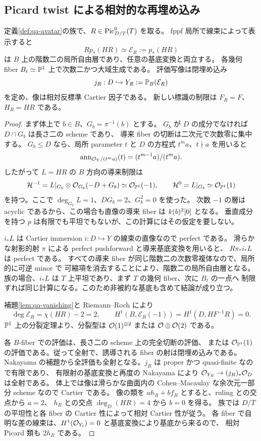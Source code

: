 \subsection{Picard twist による相対的な再埋め込み}

\begin{proposition}[垂直成分がある場合も含む直像]
\label{prop:qa-pushforward}
定義\ref{def:qa-avatar}の族で、$R\in\operatorname{Pic}^0_{D/T}(T)$ を取る。
fppf 局所で線束によって表示すると
\[
 Rp_*(HR)\simeq\mathcal E_R:=p_*(HR)
\]
は $B$ 上の階数二の局所自由層であり、任意の基底変換と両立する。
各幾何 fiber $B_t\simeq\mathbb P^1$ 上で次数二かつ大域生成である。
評価写像は閉埋め込み
\[
 j_R:D\hookrightarrow Y_R:=\mathbb P_B(\mathcal E_R)
\]
を定め、像は相対反標準 Cartier 因子である。
新しい標識の制限は $F_R=F$、$H_R=HR$ である。
\end{proposition}

\begin{proof}
まず体上で $b\in B$、$G_b=\pi^{-1}(b)$ とする。
$G_b$ が $D$ の成分でなければ $D\cap G_b$ は長さ二の scheme であり、
導来 fiber の切断は二次元で次数零に集中する。
$G_b\leq D$ なら、局所 parameter $t$ と $D$ の方程式 $t^m a$、$t\nmid a$ を用いると
\[
 \operatorname{ann}_{\mathcal O_Y/(t^ma)}(t)=(t^{m-1}a)/(t^ma).
\]
したがって $L=HR$ の $B$ 方向の導来制限は
\[
 \mathcal H^{-1}=L|_{G_b}\otimes\mathcal O_{G_b}(-D+G_b)\simeq\mathcal O_{\mathbb P^1}(-1),
 \qquad
 \mathcal H^0=L|_{G_b}\simeq\mathcal O_{\mathbb P^1}(1)
\]
を持つ。ここで $\deg_{G_b}L=1$、$D G_b=2$、$G_b^2=0$ を使った。
次数 $-1$ の層は acyclic であるから、この場合も直像の導来 fiber は $k(b)^2[0]$ となる。
垂直成分を持つ $p$ は有限でも平坦でもないが、この計算にはその仮定を要しない。

$i_*L$ は Cartier immersion $i:D\hookrightarrow Y$ の線束の直像なので perfect である。
滑らかな射影的射 $\pi$ による perfect pushforward と導来基底変換を用いると、
$R\pi_*i_*L$ は perfect である。
すべての導来 fiber が同じ階数二の次数零複体なので、局所的に可逆 minor で
可縮項を消去することにより、階数二の局所自由層となる。
族の場合、$i_*L$ は $T$ 上平坦であり、まず $T$ の幾何 fiber、次に $B_t$ の一点へ
制限すれば同じ計算になる。このため非被約な基底も含めて結論が成り立つ。

補題\ref{lem:qa-vanishing}と Riemann--Roch により
\[
 \deg\mathcal E_R=\chi(HR)-2=2,\qquad
 H^1(B,\mathcal E_R(-1))=H^1(D,HF^{-1}R)=0.
\]
$\mathbb P^1$ 上の分裂定理より、分裂型は $\mathcal O(1)^{\oplus2}$ または $\mathcal O\oplus\mathcal O(2)$ である。

各 $B$-fiber での評価は、長さ二の scheme 上の完全切断の評価、
または $\mathcal O_{\mathbb P^1}(1)$ の評価である。従って全射で、誘導される fiber の射は閉埋め込みである。
Nakayama の補題から全評価も全射となる。$j_R$ は proper かつ quasi-finite なので有限であり、
有限射の基底変換と再度の Nakayama により
$\mathcal O_{Y_R}\to(j_R)_*\mathcal O_D$ は全射である。
体上では像は滑らかな曲面内の Cohen--Macaulay な余次元一部分 scheme なので Cartier である。
像の類を $a h_R+b f_R$ とすると、ruling との交点から $a=2$、
$h_R$ との交点 $\deg_D(HR)=4$ から $b=0$ を得る。
族では $D/T$ の平坦性と各 fiber の Cartier 性によって相対 Cartier 性が従う。
各 fiber で自明な差の線束は、$H^1(\mathcal O_{Y_t})=0$ と基底変換により基底から来るので、
相対 Picard 類も $2h_R$ である。
\end{proof}

